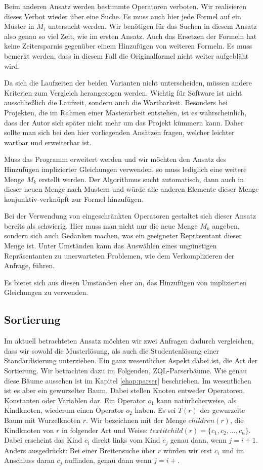 Beim anderen Ansatz werden bestimmte Operatoren verboten. Wir realisieren dieses Verbot wieder über eine Suche. Es muss auch hier jede Formel auf ein Muster in $M_i$ untersucht werden. Wir benötigen für das Suchen in diesem Ansatz also genau so viel Zeit, wie im ersten Ansatz. Auch das Ersetzen der Formeln hat keine Zeitersparnis gegenüber einem Hinzufügen von weiteren Formeln. Es muss bemerkt werden, dass in diesem Fall die Originalformel nicht weiter aufgebläht wird.

Da sich die Laufzeiten der beiden Varianten nicht unterscheiden, müssen andere Kriterien zum Vergleich herangezogen werden. Wichtig für Software ist nicht ausschließlich die Laufzeit, sondern auch die Wartbarkeit. Besonders bei Projekten, die im Rahmen einer Masterarbeit entstehen, ist es wahrscheinlich, dass der Autor sich später nicht mehr um das Projekt kümmern kann. Daher sollte man sich bei den hier vorliegenden Ansätzen fragen, welcher leichter wartbar und erweiterbar ist.

Muss das Programm erweitert werden und wir möchten den Ansatz des Hinzufügen implizierter Gleichungen verwenden, so muss lediglich eine weitere Menge $M_k$ erstellt werden. Der Algorithmus sucht automatisch, dann auch in dieser neuen Menge nach Mustern und würde alle anderen Elemente dieser Menge konjunktiv-verknüpft zur Formel hinzufügen. 

Bei der Verwendung von eingeschränkten Operatoren gestaltet sich dieser Ansatz bereits als schwierig. Hier muss man nicht nur die neue Menge $M_k$ angeben, sondern sich auch Gedanken machen, was ein geeigneter Repräsentant dieser Menge ist. Unter Umständen kann das Auswählen eines ungünstigen Repräsentanten zu unerwarteten Problemen, wie dem Verkomplizieren der Anfrage, führen.

Es bietet sich aus diesen Umständen eher an, das Hinzufügen von implizierten Gleichungen zu verwenden.

\subsection{Sortierung}

Im aktuell betrachteten Ansatz möchten wir zwei Anfragen dadurch vergleichen, dass wir sowohl die Musterlösung, als auch die Studentenlösung einer Standardisierung unterziehen. Ein ganz wesentlicher Aspekt dabei ist, die Art der Sortierung. Wir betrachten dazu im Folgenden, ZQL-Parserbäume. Wie genau diese Bäume aussehen ist im Kapitel \ref{chap:parser} beschrieben. Im wesentlichen ist es aber ein gewurzelter Baum. Dabei stellen Knoten entweder Operatoren, Konstanten oder Variablen dar. Ein Operator $o_1$ kann natürlicherweise, als Kindknoten, wiederum einen Operator $o_2$ haben. Es sei $T(r)$ der gewurzelte Baum mit Wurzelknoten $r$. Wir bezeichnen mit der Menge $\mathit{children}(r)$, die Kindknoten von $r$ in folgender Art und Weise: $textit{child}(r) = \{c_1, c_2, ..., c_n\}$. Dabei erscheint das Kind $c_i$ direkt links vom Kind $c_j$ genau dann, wenn $j = i + 1$. Anders ausgedrückt: Bei einer Breitensuche über $r$ würden wir erst $c_i$ und im Anschluss daran $c_j$ auffinden, genau dann wenn $j = i + $.

